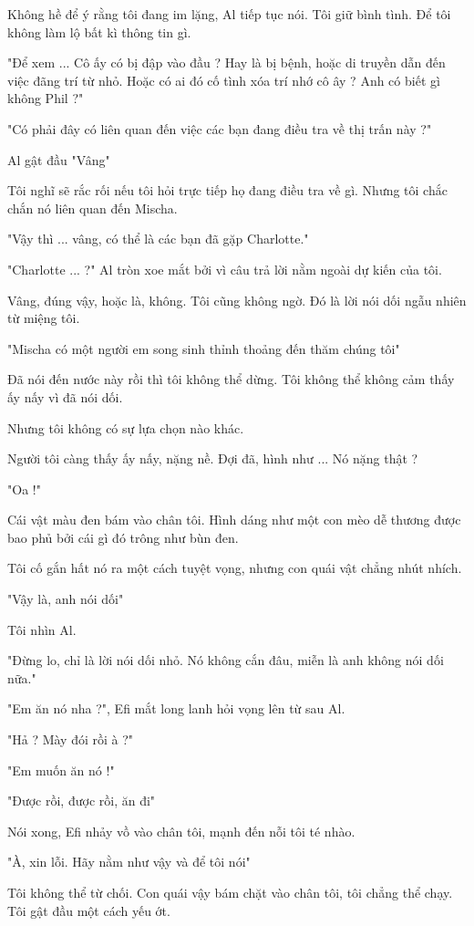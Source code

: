 Không hề để ý rằng tôi đang im lặng, Al tiếp tục nói. Tôi giữ bình tình. Để tôi không làm lộ bất kì thông tin gì.

"Để xem ... Cô ấy có bị đập vào đầu ? Hay là bị bệnh, hoặc di truyền dẫn đến việc đãng trí từ nhỏ. Hoặc có ai đó cố tình xóa trí nhớ cô ây ? Anh có biết gì không Phil ?"

"Có phải đây có liên quan đến việc các bạn đang điều tra về thị trấn này ?"

Al gật đầu "Vâng"

Tôi nghĩ sẽ rắc rối nếu tôi hỏi trực tiếp họ đang điều tra về gì. Nhưng tôi chắc chắn nó liên quan đến Mischa.

"Vậy thì ... vâng, có thể là các bạn đã gặp Charlotte."

"Charlotte ... ?" Al tròn xoe mắt bởi vì câu trả lời nằm ngoài dự kiến của tôi.

Vâng, đúng vậy, hoặc là, không. Tôi cũng không ngờ. Đó là lời nói dối ngẫu nhiên từ miệng tôi.

"Mischa có một người em song sinh thỉnh thoảng đến thăm chúng tôi"

Đã nói đến nước này rồi thì tôi không thể dừng. Tôi không thể không cảm thấy ấy nấy vì đã nói dối.

Nhưng tôi không có sự lựa chọn nào khác.

Người tôi càng thấy ấy nấy, nặng nề. Đợi đã, hình như ...
Nó nặng thật ?

"Oa !"

Cái vật màu đen bám vào chân tôi. Hình dáng như một con mèo dễ thương được bao phủ bởi cái gì đó trông như bùn đen.

Tôi cố gắn hất nó ra một cách tuyệt vọng, nhưng con quái vật chẳng nhút nhích.

"Vậy là, anh nói dối"

Tôi nhìn Al.

"Đừng lo, chỉ là lời nói dối nhỏ. Nó không cắn đâu, miễn là anh không nói dối nữa."

"Em ăn nó nha ?", Efi mắt long lanh hỏi vọng lên từ sau Al.

"Hả ? Mày đói rồi à ?"

"Em muốn ăn nó !"

"Được rồi, được rồi, ăn đi"

Nói xong, Efi nhảy vồ vào chân tôi, mạnh đến nỗi tôi té nhào.

"À, xin lỗi. Hãy nằm như vậy và để tôi nói"

Tôi không thể từ chối. Con quái vậy bám chặt vào chân tôi, tôi chẳng thể chạy. Tôi gật đầu một cách yếu ớt.

